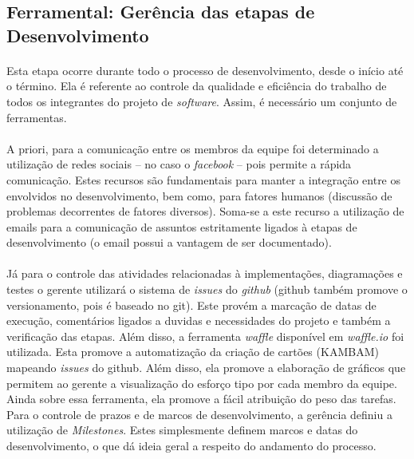 \documentclass[12pt,a4paper]{article}
\begin{document}
	\subsection{Ferramental: Gerência das etapas de Desenvolvimento}
	\paragraph{} Esta etapa ocorre durante todo o processo de desenvolvimento, desde o início até o término. Ela é referente ao controle da qualidade e eficiência do trabalho de todos os integrantes do projeto de \textit{software}. Assim, é necessário um conjunto de ferramentas. 
	\paragraph{} A priori, para a comunicação entre os membros da equipe foi determinado a utilização de redes sociais -- no caso o \textit{facebook} -- pois permite a rápida comunicação. Estes recursos são fundamentais para manter a integração entre os envolvidos no desenvolvimento, bem como, para fatores humanos (discussão de problemas decorrentes de fatores diversos). Soma-se a este recurso a utilização de emails para a comunicação de assuntos estritamente ligados à etapas de desenvolvimento (o email possui a vantagem de ser documentado).
	\paragraph{} Já para o controle das atividades relacionadas à implementações, diagramações e testes o gerente utilizará o sistema de \textit{issues} do \textit{github} (github também promove o versionamento, pois é baseado no git). Este provém a marcação de datas de execução, comentários ligados a duvidas e necessidades do projeto e também a verificação das etapas. Além disso, a ferramenta \textit{waffle} disponível em \textit{waffle.io} foi utilizada. Esta promove a automatização da criação de cartões (KAMBAM) mapeando \textit{issues} do github. Além disso, ela promove a elaboração de gráficos que permitem ao gerente a visualização do esforço tipo por cada membro da equipe. Ainda sobre essa ferramenta, ela promove a fácil atribuição do peso das tarefas.
	Para o controle de prazos e de marcos de desenvolvimento, a gerência definiu a utilização de \textit{Milestones}. Estes simplesmente definem marcos e datas do desenvolvimento, o que dá ideia geral a respeito do andamento do processo.
	
\end{document}
